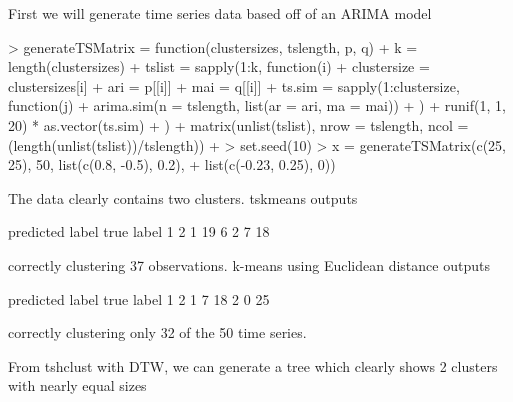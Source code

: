 \documentclass{article}
\begin{document}
First we will generate time series data based off of an ARIMA model
\begin{Schunk}
\begin{Sinput}
> generateTSMatrix = function(clustersizes, tslength, p, q) {
+     k = length(clustersizes)
+     tslist = sapply(1:k, function(i) {
+         clustersize = clustersizes[i]
+         ari = p[[i]]
+         mai = q[[i]]
+         ts.sim = sapply(1:clustersize, function(j) {
+             arima.sim(n = tslength, list(ar = ari, ma = mai))
+         })
+         runif(1, 1, 20) * as.vector(ts.sim)
+     })
+     matrix(unlist(tslist), nrow = tslength, ncol = (length(unlist(tslist))/tslength))
+ }
> set.seed(10)
> x = generateTSMatrix(c(25, 25), 50, list(c(0.8, -0.5), 0.2), 
+     list(c(-0.23, 0.25), 0))
\end{Sinput}
\end{Schunk}

The data clearly contains two clusters.  tskmeans outputs

\begin{Schunk}
\begin{Soutput}
          predicted label
true label  1  2
         1 19  6
         2  7 18
\end{Soutput}
\end{Schunk}

correctly clustering 37 observations.  k-means using Euclidean distance outputs

\begin{Schunk}
\begin{Soutput}
          predicted label
true label  1  2
         1  7 18
         2  0 25
\end{Soutput}
\end{Schunk}

correctly clustering only 32 of the 50 time series.

From tshclust with DTW, we can generate a tree which clearly shows 2 clusters
with nearly equal sizes
\end{document}
